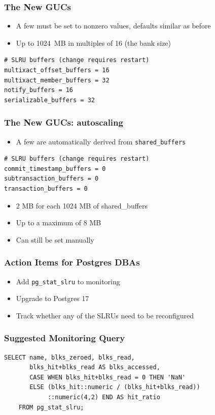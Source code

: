 \begin{frame}[fragile]
  \frametitle{The New GUCs}
  \begin{itemize}
    \item A few must be set to nonzero values, defaults similar as before
    \item Up to 1024~MB in multiples of 16 (the bank size)
  \end{itemize}
  \begin{lstlisting}[frame=trBL,frameround=fttt]
# SLRU buffers (change requires restart)
multixact_offset_buffers = 16
multixact_member_buffers = 32
notify_buffers = 16
serializable_buffers = 32
  \end{lstlisting}  
\end{frame}

\begin{frame}[fragile]
  \frametitle{The New GUCs: autoscaling}
  \begin{itemize}
    \item A few are automatically derived from \texttt{shared\_buffers}
  \end{itemize}
  \begin{lstlisting}[frame=trBL,frameround=fttt]
# SLRU buffers (change requires restart)
commit_timestamp_buffers = 0
subtransaction_buffers = 0
transaction_buffers = 0
  \end{lstlisting}  
  \begin{itemize}
    \item 2 MB for each 1024 MB of shared\_buffers
    \item Up to a maximum of 8 MB
    \item Can still be set manually
  \end{itemize}
\end{frame}

\begin{frame}
  \frametitle{Action Items for Postgres DBAs}

  \begin{itemize}
    \item Add \texttt{pg\_stat\_slru} to monitoring
    \item Upgrade to Postgres 17
    \item Track whether any of the SLRUs need to be reconfigured
  \end{itemize}
\end{frame}

\begin{frame}[fragile]
  \frametitle{Suggested Monitoring Query}

  \begin{lstlisting}[frame=trBL,frameround=fttt]
  SELECT name, blks_zeroed, blks_read,
       blks_hit+blks_read AS blks_accessed,
       CASE WHEN blks_hit+blks_read = 0 THEN 'NaN'
       ELSE (blks_hit::numeric / (blks_hit+blks_read))
            ::numeric(4,2) END AS hit_ratio
    FROM pg_stat_slru;
  \end{lstlisting}
\end{frame}

